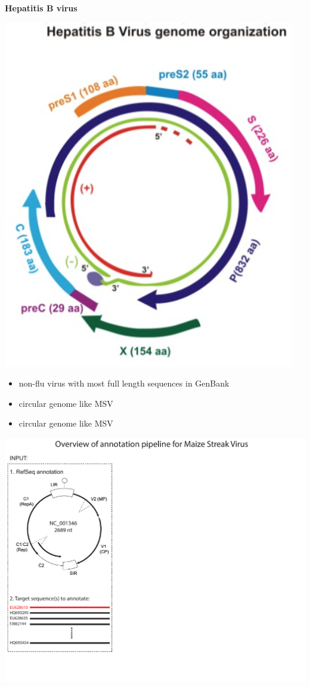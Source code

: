 \documentclass[landscape]{slides}
\begin{document}
\begin{slide}
\begin{center}
\textbf{Hepatitis B virus}

\includegraphics[height=6in]{figs/hbv-genome}

\begin{itemize}
\item non-flu virus with most full length sequences in GenBank
\item circular genome like MSV
\item circular genome like MSV
\end{itemize}

\vfill
\end{center}
\end{slide}
\begin{slide}
\includegraphics[width=10in]{figs/annotation-schematic-1}
\vfill
\end{slide}
\end{document}
